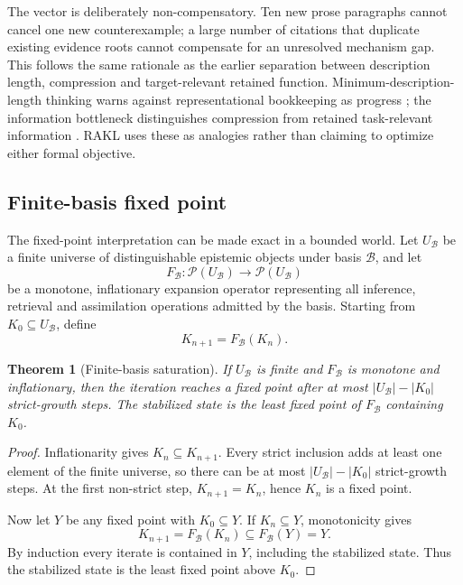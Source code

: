 \documentclass[11pt]{article}
\newcommand{\powerset}{\mathcal P}
\newtheorem{theorem}{Theorem}
\begin{document}
The vector is deliberately non-compensatory. Ten new prose paragraphs cannot cancel one new counterexample; a large number of citations that duplicate existing evidence roots cannot compensate for an unresolved mechanism gap. This follows the same rationale as the earlier separation between description length, compression and target-relevant retained function. Minimum-description-length thinking warns against representational bookkeeping as progress \cite{rissanen1978}; the information bottleneck distinguishes compression from retained task-relevant information \cite{tishby2000}. RAKL uses these as analogies rather than claiming to optimize either formal objective.

\subsection{Finite-basis fixed point}

The fixed-point interpretation can be made exact in a bounded world. Let \(U_{\mathcal B}\) be a finite universe of distinguishable epistemic objects under basis \(\mathcal B\), and let
\[
F_{\mathcal B}:\powerset(U_{\mathcal B})\to\powerset(U_{\mathcal B})
\]
be a monotone, inflationary expansion operator representing all inference, retrieval and assimilation operations admitted by the basis. Starting from \(K_0\subseteq U_{\mathcal B}\), define
\[
K_{n+1}=F_{\mathcal B}(K_n).
\]

\begin{theorem}[Finite-basis saturation]
If \(U_{\mathcal B}\) is finite and \(F_{\mathcal B}\) is monotone and inflationary, then the iteration reaches a fixed point after at most \(|U_{\mathcal B}|-|K_0|\) strict-growth steps. The stabilized state is the least fixed point of \(F_{\mathcal B}\) containing \(K_0\).
\end{theorem}

\begin{proof}
Inflationarity gives \(K_n\subseteq K_{n+1}\). Every strict inclusion adds at least one element of the finite universe, so there can be at most \(|U_{\mathcal B}|-|K_0|\) strict-growth steps. At the first non-strict step, \(K_{n+1}=K_n\), hence \(K_n\) is a fixed point.

Now let \(Y\) be any fixed point with \(K_0\subseteq Y\). If \(K_n\subseteq Y\), monotonicity gives
\[
K_{n+1}=F_{\mathcal B}(K_n)\subseteq F_{\mathcal B}(Y)=Y.
\]
By induction every iterate is contained in \(Y\), including the stabilized state. Thus the stabilized state is the least fixed point above \(K_0\).
\end{proof}
\end{document}
